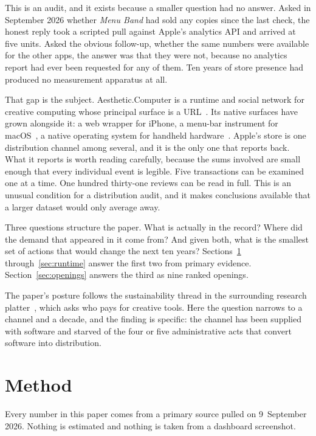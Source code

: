 \documentclass[10pt,letterpaper,twocolumn]{article}
\newcommand{\acdot}{{\color{acpink}.}}
\newcommand{\ac}{Aesthetic{\acdot}Computer}
\begin{document}
This is an audit, and it exists because a smaller question had no
answer. Asked in September 2026 whether \emph{Menu Band} had sold any
copies since the last check, the honest reply took a scripted pull
against Apple's analytics API and arrived at five units. Asked the
obvious follow-up, whether the same numbers were available for the other
apps, the answer was that they were not, because no analytics report had
ever been requested for any of them. Ten years of store presence had
produced no measurement apparatus at all.

That gap is the subject. \ac{} is a runtime and social network for
creative computing whose principal surface is a URL~\citep{scudder2026ac}.
Its native surfaces have grown alongside it: a web wrapper for iPhone, a
menu-bar instrument for macOS~\citep{scudder2026notepat}, a native
operating system for handheld hardware~\citep{scudder2026os}. Apple's
store is one distribution channel among several, and it is the only one
that reports back. What it reports is worth reading carefully, because
the sums involved are small enough that every individual event is legible.
Five transactions can be examined one at a time. One hundred thirty-one
reviews can be read in full. This is an unusual condition for a
distribution audit, and it makes conclusions available that a larger
dataset would only average away.

Three questions structure the paper. What is actually in the record?
Where did the demand that appeared in it come from? And given both, what
is the smallest set of actions that would change the next ten years?
Sections~\ref{sec:method} through~\ref{sec:runtime} answer the first two
from primary evidence. Section~\ref{sec:openings} answers the third as
nine ranked openings.

The paper's posture follows the sustainability thread in the surrounding
research platter~\citep{scudder2026sustainability}, which asks who pays
for creative tools. Here the question narrows to a channel and a decade,
and the finding is specific: the channel has been supplied with software
and starved of the four or five administrative acts that convert software
into distribution.

\section{Method}
\label{sec:method}

Every number in this paper comes from a primary source pulled on
9~September 2026. Nothing is estimated and nothing is taken from a
dashboard screenshot.
\end{document}
